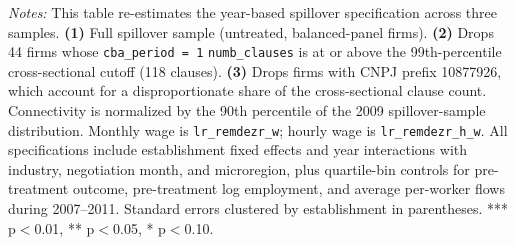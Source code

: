 \begin{table}[H]
\begin{minipage}{\linewidth}
\footnotesize\vspace{4pt}
\textit{Notes:} This table re-estimates the year-based spillover specification across three samples. \textbf{(1)} Full spillover sample (untreated, balanced-panel firms). \textbf{(2)} Drops 44 firms whose \texttt{cba\_period\,=\,1} \texttt{numb\_clauses} is at or above the 99th-percentile cross-sectional cutoff (118 clauses). \textbf{(3)} Drops firms with CNPJ prefix 10877926, which account for a disproportionate share of the cross-sectional clause count. Connectivity is normalized by the 90th percentile of the 2009 spillover-sample distribution. Monthly wage is \texttt{lr\_remdezr\_w}; hourly wage is \texttt{lr\_remdezr\_h\_w}. All specifications include establishment fixed effects and year interactions with industry, negotiation month, and microregion, plus quartile-bin controls for pre-treatment outcome, pre-treatment log employment, and average per-worker flows during 2007--2011. Standard errors clustered by establishment in parentheses. *** p$<$0.01, ** p$<$0.05, * p$<$0.10.
\end{minipage}
\end{table}
